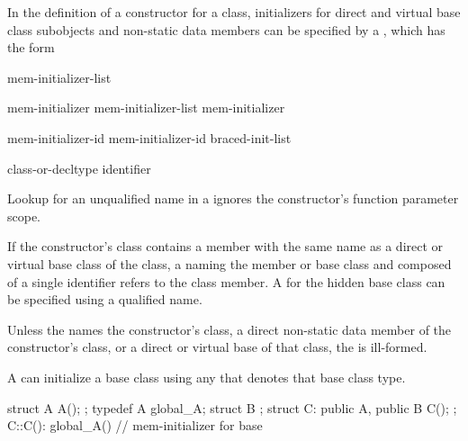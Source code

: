 \pnum
In the definition of a constructor for a class,
initializers for direct and virtual base class subobjects and
non-static data members can be specified by a
,
which has the form

\begin{bnf}
\br
    \terminal{:} mem-initializer-list
\end{bnf}

\begin{bnf}
\br
    mem-initializer \br
    mem-initializer-list \terminal{,} mem-initializer 
\end{bnf}

\begin{bnf}
\br
    mem-initializer-id \terminal{(}  \terminal{)}\br
    mem-initializer-id braced-init-list
\end{bnf}

\begin{bnf}
\br
    class-or-decltype\br
    identifier
\end{bnf}

\pnum
Lookup for an unqualified name in a 
ignores the constructor's function parameter scope.
\begin{note}
If the constructor's class contains a member with the same name as a direct
or virtual base class of the class, a
naming the member or base class and composed of a single identifier
refers to the class member.
A
for the hidden base class can be specified using a qualified name.
\end{note}
Unless the
names the constructor's class,
a direct non-static data member of the constructor's class, or
a direct or virtual base of that class,
the
is ill-formed.

\pnum
A
can initialize a base class using any  that denotes that base class type.
\begin{example}
\begin{codeblock}
struct A { A(); };
typedef A global_A;
struct B { };
struct C: public A, public B { C(); };
C::C(): global_A() { }          // mem-initializer for base 
\end{codeblock}
\end{example}

